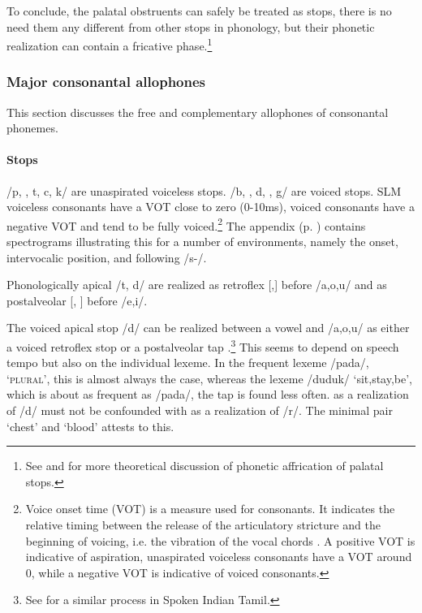 To conclude, the palatal obstruents can safely be treated as stops, there is no need them any different from other stops in phonology, but their phonetic realization can contain a fricative phase.\footnote{See \citet{Clements1999affr} and \citet{Kehrein2002affr} for more theoretical discussion of phonetic affrication of palatal stops.}

\subsubsection{Major consonantal allophones}\label{sec:phon:Majorconsonantalallophones}
This section discusses the free and complementary  allophones of consonantal phonemes.

\paragraph{Stops}
/p, \dentt, t, c, k/  are unaspirated voiceless stops. /b, \dentd, d, \J, g/ are voiced stops. SLM voiceless consonants have a VOT close to zero (0-10ms), voiced consonants have a negative VOT and tend to be fully voiced.\footnote{
Voice onset time (VOT) is a measure used for consonants. It indicates the relative timing between the release of the articulatory stricture and the beginning of voicing, i.e. the vibration of the vocal chords \citep[19f]{Ladefoged1975course}. A  positive VOT is indicative of aspiration, unaspirated voiceless consonants have a VOT around 0, while a negative VOT is indicative of voiced consonants.}
The appendix (p. \pageref{sec:VOT}) contains spectrograms illustrating this for a number of environments, namely the onset, intervocalic position, and following /s-/.


Phonologically apical /t, d/ are realized as retroflex [\tz,\dz] before /a,o,u/  and as postalveolar [\postalvt, \postalvd] before /e,i/.

The voiced apical stop /d/ can be realized between a vowel and /a,o,u/ as either a voiced retroflex stop \phonet{\dz} or a  postalveolar tap .\footnote{See \citet[14]{Schiffman1999} for a similar process in Spoken Indian Tamil.} This seems to depend on speech tempo but also on the individual lexeme. In the frequent lexeme /pada/, `\textsc{plural}', this is almost always the case, whereas the lexeme /duduk/ `sit,stay,be', which is about as frequent as /pada/, the tap is found less often.  as a  realization of /d/ must not be confounded with  as a realization of /r/. The minimal pair  `chest' and  `blood' attests to this.

